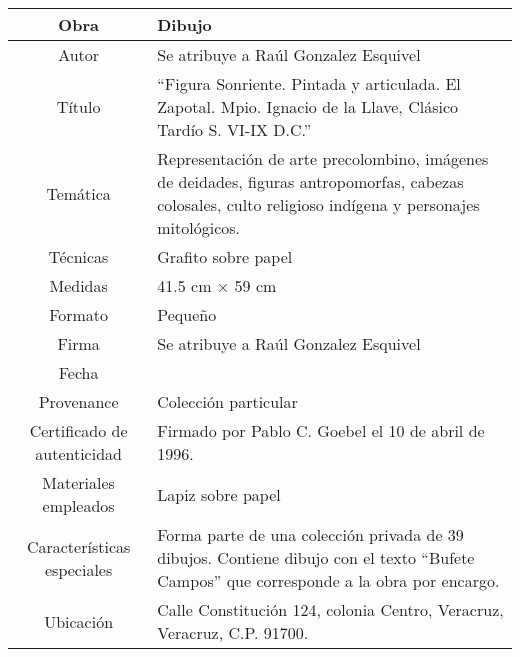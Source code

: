 \documentclass[10pt,letter]{report}
\begin{document}
\begin{table}[H]
\centering
\begin{tabular}{|c|m{}|}
\hline
Obra& Dibujo	\\
\hline
Autor & Se atribuye a Ra\'ul Gonzalez Esquivel\\
\hline
T\'itulo & ``Figura Sonriente. Pintada y articulada. El Zapotal. Mpio. Ignacio de la Llave, Cl\'asico Tard\'io S. VI-IX D.C.''\\
\hline
Tem\'atica & Representaci\'on de arte precolombino, im\'agenes de deidades, figuras antropomorfas, cabezas colosales, culto religioso ind\'igena y personajes mitol\'ogicos.\\
\hline
T\'ecnicas &Grafito sobre papel \\
\hline
Medidas & 41.5 cm $\times$ 59 cm \\
\hline
 Formato & Peque\~no \\
 \hline
 Firma & Se atribuye a Ra\'ul Gonzalez Esquivel\\ 
 \hline
  Fecha & \\
 \hline
 Provenance & Colecci\'on particular\\
 \hline
 Certificado de autenticidad& Firmado por Pablo C. Goebel el 10 de abril de 1996.  \\
 \hline 
  Materiales empleados & Lapiz sobre papel\\
 \hline
 Caracter\'isticas especiales & Forma parte de una colecci\'on privada de 39 dibujos. 
Contiene dibujo con el texto ``Bufete Campos'' que corresponde a la obra por encargo. \\
\hline 
Ubicaci\'on & Calle Constituci\'on 124, colonia Centro, Veracruz, Veracruz, C.P. 91700.\\
\hline

\end{tabular}
\end{table}
\end{document}
